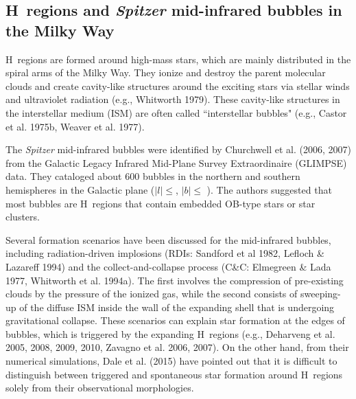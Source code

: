 \documentclass[onecolumn]{pasj01}
\begin{document}
\subsection{{H\, regions and {\it Spitzer} mid-infrared bubbles in the Milky Way}}
{H\, regions are formed around high-mass stars, {which are} mainly {distributed} in the spiral {arms of} the Milky Way. They {ionize and} destroy {the} parent molecular clouds and {create cavity-like structures} around the exciting stars via stellar wind{s} and ultraviolet radiation (e.g., Whitworth 1979). These cavity-like structures in the interstellar medium (ISM) are often called “interstellar {bubbles}" (e.g., Castor et al. 1975b, Weaver et al. 1977).}


{The {\it Spitzer} mid-infrared bubbles were {identified} by Churchwell et al. (2006, 2007) {from} the Galactic Legacy Infrared Mid-Plane Survey Extraordinaire (GLIMPSE) data. They cataloged about 600 bubbles in {the} northern and southern hemisphere{s} in the Galactic plane {($|l|$$\leq$, $|b|$$\leq$ ).}
The authors suggested that most bubbles are H\, regions {that} contain embedded OB-type stars or star clusters.}

{Several formation scenarios have been discussed for the mid-infrared bubbles, including radiation-driven implosions (RDIs: Sandford et al 1982, Lefloch \& Lazareff 1994) and {the} collect-and-collapse process (C\&C: Elmegreen \& Lada 1977, Whitworth et al. 1994a). The first involves the compression of pre-existing clouds by the pressure of the ionized gas, while the second consists of sweeping-up of the diffuse ISM inside the wall of the expanding shell that is undergoing} gravitational collapse. These scenarios can explain {star formation at the edges of {bubbles}, which is triggered by the expanding {H\, regions} (e.g., Deharveng et al. 2005, 2008, 2009, 2010, Zavagno et al. 2006, 2007). On the other hand, from their numerical simulations, Dale et al. (2015) have pointed out that it is difficult to distinguish between triggered and spontaneous star formation around H\, regions solely from their observational morphologies.}

\end{document}

